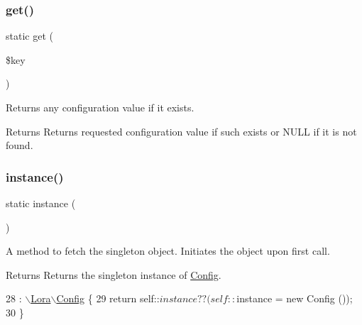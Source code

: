 \subsubsection{\texorpdfstring{get()}{get()}}
{\footnotesize\ttfamily static get (\begin{DoxyParamCaption}\item[{}]{\$key }\end{DoxyParamCaption})\hspace{0.3cm}{\ttfamily [static]}}

Returns any configuration value if it exists. \begin{DoxyReturn}{Returns}
Returns requested configuration value if such exists or N\+U\+LL if it is not found. 
\end{DoxyReturn}

\mbox{\label{class_lora_1_1_config_a0deb004950b8dc4f51836316fd19c111}} 
\subsubsection{\texorpdfstring{instance()}{instance()}}
{\footnotesize\ttfamily static instance (\begin{DoxyParamCaption}{ }\end{DoxyParamCaption})\hspace{0.3cm}{\ttfamily [static]}}

A method to fetch the singleton object. Initiates the object upon first call. \begin{DoxyReturn}{Returns}
Returns the singleton instance of \hyperlink{class_lora_1_1_config}{Config}. 
\end{DoxyReturn}

\begin{DoxyCode}
28                                        : \hyperlink{class_lora_1_1_config}{\(\backslash\)Lora\(\backslash\)Config} \{
29         \textcolor{keywordflow}{return} self::$instance ?? (self::$instance = \textcolor{keyword}{new} Config ());
30     \}
\end{DoxyCode}
\mbox{\label{class_lora_1_1_config_ac14c17dc35a55cd5a44db48d7d7d1fd9}} 
